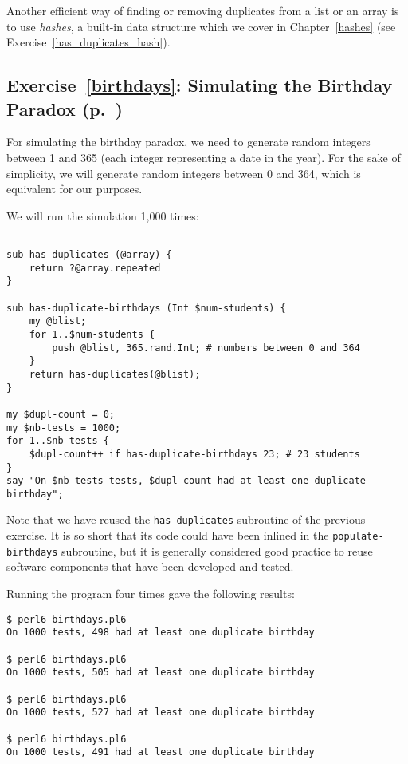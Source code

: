 Another efficient way of finding or removing duplicates 
from a list or an array is to use \emph{hashes}, a 
built-in data structure which we cover in 
Chapter~\ref{hashes} (see Exercise~\ref{has_duplicates_hash}).

\subsection{Exercise~\ref{birthdays}: Simulating the Birthday Paradox (p.~\pageref{birthdays})}
\label{sol_birthdays}

For simulating the birthday paradox, we need to generate 
random integers between 1 and 365 (each integer 
representing a date in the year). For the sake of 
simplicity, we will generate random integers between 
0 and 364, which is equivalent for our purposes.

We will run the simulation 1,000 times:

\begin{verbatim}

sub has-duplicates (@array) {
    return ?@array.repeated
}

sub has-duplicate-birthdays (Int $num-students) {
    my @blist;
    for 1..$num-students {
        push @blist, 365.rand.Int; # numbers between 0 and 364
    }
    return has-duplicates(@blist);
}

my $dupl-count = 0;
my $nb-tests = 1000;
for 1..$nb-tests {
    $dupl-count++ if has-duplicate-birthdays 23; # 23 students
}
say "On $nb-tests tests, $dupl-count had at least one duplicate birthday";
\end{verbatim}

Note that we have reused the {\tt has-duplicates} 
subroutine of the previous exercise. It is so short 
that its code could have been inlined in the 
\verb'populate-birthdays' subroutine, but it is 
generally considered good practice to reuse software 
components that have been developed and tested.

Running the program four times gave the following 
results:

\begin{verbatim}
$ perl6 birthdays.pl6
On 1000 tests, 498 had at least one duplicate birthday

$ perl6 birthdays.pl6
On 1000 tests, 505 had at least one duplicate birthday

$ perl6 birthdays.pl6
On 1000 tests, 527 had at least one duplicate birthday

$ perl6 birthdays.pl6
On 1000 tests, 491 had at least one duplicate birthday
\end{verbatim}

